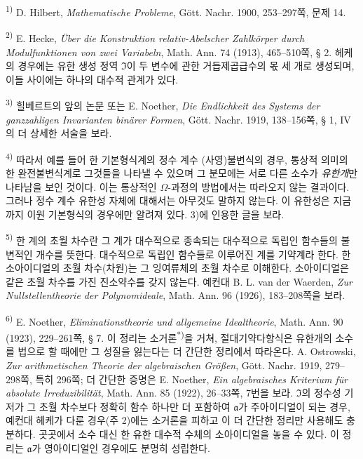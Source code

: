 {\small
\setlength{\parindent}{0pt}

\noindent\textsuperscript{1)} D. Hilbert, \emph{Mathematische Probleme}, Gött. Nachr. 1900, 253--297쪽, 문제 14.

\noindent\textsuperscript{2)} E. Hecke, \emph{Über die Konstruktion relativ-Abelscher Zahlkörper durch Modulfunktionen von zwei Variabeln}, Math. Ann. 74 (1913), 465--510쪽, § 2. 헤케의 경우에는 유한 생성 정역 \(\mathfrak I\)이 두 변수에 관한 거듭제곱급수의 몫 세 개로 생성되며, 이들 사이에는 하나의 대수적 관계가 있다.

\noindent\textsuperscript{3)} 힐베르트의 앞의 논문 또는 E. Noether, \emph{Die Endlichkeit des Systems der ganzzahligen Invarianten binärer Formen}, Gött. Nachr. 1919, 138--156쪽, § 1, IV의 더 상세한 서술을 보라.

\noindent\textsuperscript{4)} 따라서 예를 들어 한 기본형식계의 정수 계수 (사영)불변식의 경우, 통상적 의미의 한 완전불변식계로 그것들을 나타낼 수 있으며 그 분모에는 서로 다른 소수가 \emph{유한개}만 나타남을 보인 것이다. 이는 통상적인 \(\Omega\)-과정의 방법에서는 따라오지 않는 결과이다. 그러나 정수 계수 유한성 자체에 대해서는 아무것도 말하지 않는다. 이 유한성은 지금까지 이원 기본형식의 경우에만 알려져 있다. 3)에 인용한 글을 보라.

\noindent\textsuperscript{5)} 한 계의 \glqq{}초월 차수\grqq{}란 그 계가 대수적으로 종속되는 대수적으로 독립인 함수들의 불변적인 개수를 뜻한다. 대수적으로 독립인 함수들로 이루어진 계를 기약계라 한다. 한 소아이디얼의 초월 차수(차원)는 그 잉여류체의 초월 차수로 이해한다. 소아이디얼은 같은 초월 차수를 가진 진소약수를 갖지 않는다. 예컨대 B. L. van der Waerden, \emph{Zur Nullstellentheorie der Polynomideale}, Math. Ann. 96 (1926), 183--208쪽을 보라.

\noindent\textsuperscript{6)} E. Noether, \emph{Eliminationstheorie und allgemeine Idealtheorie}, Math. Ann. 90 (1923), 229--261쪽, § 7. 이 정리는 소거론\textsuperscript{*)}을 거쳐, 절대기약다항식은 유한개의 소수를 법으로 할 때에만 그 성질을 잃는다는 더 간단한 정리에서 따라온다. A. Ostrowski, \emph{Zur arithmetischen Theorie der algebraischen Größen}, Gött. Nachr. 1919, 279--298쪽, 특히 296쪽; 더 간단한 증명은 E. Noether, \emph{Ein algebraisches Kriterium für absolute Irreduzibilität}, Math. Ann. 85 (1922), 26--33쪽, 7번을 보라. \(\mathfrak I\)의 정수성 기저가 그 초월 차수보다 정확히 함수 하나만 더 포함하여 \(\mathfrak a\)가 주아이디얼이 되는 경우, 예컨대 헤케가 다룬 경우(주 2)에는 소거론을 피하고 이 더 간단한 정리만 사용해도 충분하다. 곳곳에서 소수 대신 한 유한 대수적 수체의 소아이디얼을 놓을 수 있다. 이 정리는 \(\mathfrak a\)가 영아이디얼인 경우에도 분명히 성립한다.

}

